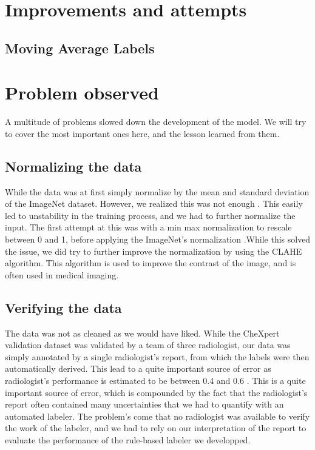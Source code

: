 \documentclass[11pt]{article}
\begin{document}
    \section{Improvements and attempts}

    \subsection{Moving Average Labels}


    \section{Problem observed}

    A multitude of problems slowed down the development of the model. We will try to cover the most
    important ones here, and the lesson learned from them.


    \subsection{Normalizing the data}

        While the data was at first simply normalize by the mean and standard deviation of the ImageNet dataset.
        However, we realized this was not enough . This easily led to unstability in the training process, and we had to further
        normalize the input. The first attempt at this was with a min max normalization to rescale between 0 and 1, before applying the ImageNet's normalization
        .While this solved the issue, we did try to further improve the normalization by using the CLAHE algorithm. This algorithm is used to improve the contrast of the image, and is often used in medical imaging.

    \subsection{Verifying the data}
            The data was not as cleaned as we would have liked. While the CheXpert validation dataset was validated by a team of three radiologist, our data
            was simply annotated by a single radiologist's report, from which the labels were then automatically derived. This lead to a quite important source of error as radiologist's performance
            is estimated to be between 0.4 and 0.6 \cite{radiologist_performance}. This is a quite important source of error, which is compounded
            by the fact that the radiologist's report often contained many uncertainties that we had
            to quantify with an automated labeler. The problem's come that no radiologist was available to verify the work of the labeler, and we had to rely on our interpretation of
            the report to evaluate the performance of the rule-based labeler we developped.
\end{document}
